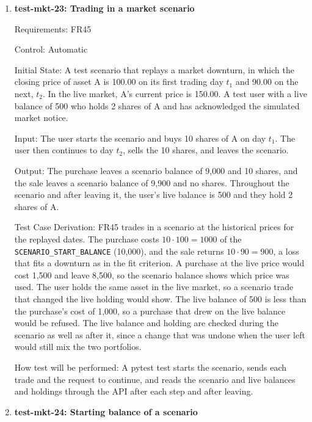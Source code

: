 \documentclass[12pt, titlepage]{article}
\begin{document}
\begin{enumerate}
How test will be performed: The tester records any text that tells the user to
buy or sell a named asset or presents an asset as a pick. The reviewer does
the same for each message template and content item.

\item{\textbf{test-mkt-23: Trading in a market scenario}\\}

Requirements: FR45

Control: Automatic

Initial State: A test scenario that replays a market downturn, in which the
closing price of asset A is 100.00 on its first trading day $t_1$ and 90.00
on the next, $t_2$. In the live market, A's current price is 150.00. A test
user with a live balance of 500 who holds 2 shares of A and has acknowledged
the simulated market notice.

Input: The user starts the scenario and buys 10 shares of A on day $t_1$. The
user then continues to day $t_2$, sells the 10 shares, and leaves the
scenario.

Output: The purchase leaves a scenario balance of 9,000 and 10 shares, and
the sale leaves a scenario balance of 9,900 and no shares. Throughout the
scenario and after leaving it, the user's live balance is 500 and they hold 2
shares of A.

Test Case Derivation: FR45 trades in a scenario at the historical prices for
the replayed dates. The purchase costs $10 \cdot 100 = 1000$ of the
\texttt{SCENARIO\_START\_BALANCE} (10,000), and the sale returns
$10 \cdot 90 = 900$, a loss that fits a downturn as in the fit criterion. A
purchase at the live price would cost 1,500 and leave 8,500, so the scenario
balance shows which price was used. The user holds the same asset in the live
market, so a scenario trade that changed the live holding would show. The live
balance of 500 is less than the purchase's cost of 1,000, so a purchase that
drew on the live balance would be refused. The live balance and holding are
checked during the scenario as well as after it, since a change that was
undone when the user left would still mix the two portfolios.

How test will be performed: A pytest test starts the scenario, sends each
trade and the request to continue, and reads the scenario and live balances
and holdings through the API after each step and after leaving.

\item{\textbf{test-mkt-24: Starting balance of a scenario}\\}


\end{enumerate}
\end{document}
